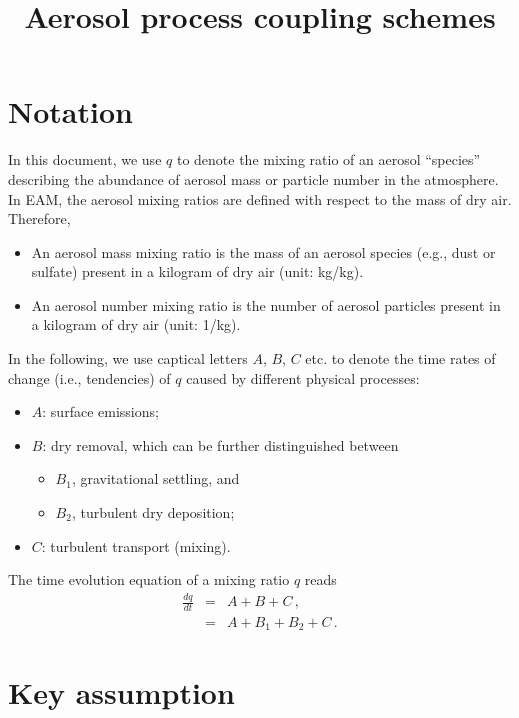 \documentclass[12pt]{article}
\title{Aerosol process coupling schemes}
\date{}
\begin{document}
\maketitle


\section{Notation}

In this document, we use $q$ to denote the mixing ratio of an aerosol ``species'' describing the abundance of aerosol mass or particle number in the atmosphere. In EAM, the aerosol mixing ratios are defined with respect to the mass of dry air. Therefore,
\begin{itemize}
    \item An aerosol mass mixing ratio is the mass of an aerosol species (e.g., dust or sulfate) present in a kilogram of dry air (unit: kg/kg).
    \item An aerosol number mixing ratio is the number of aerosol particles present in a kilogram of dry air (unit: 1/kg).
\end{itemize}

In the following, we use captical letters $A$, $B$, $C$ etc. to denote the time rates of change (i.e., tendencies) of $q$ caused by different physical processes:
\begin{itemize}
    \item $A$: surface emissions;
    \item $B$: dry removal, which can be further distinguished between
    \begin{itemize}
        \item $B_1$, gravitational settling, and
        \item $B_2$, turbulent dry deposition;
    \end{itemize} 
    \item $C$: turbulent transport (mixing).
\end{itemize}

The time evolution equation of a mixing ratio $q$ reads 
\begin{eqnarray}
\frac{dq}{dt} &=& A + B + C \,,\\
&=& A + B_1 + B_2 + C \,.
\end{eqnarray}

\section{Key assumption}
\end{document}
